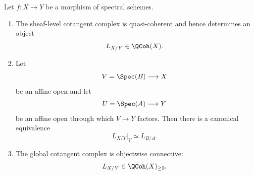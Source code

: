 \begin{theorem}
\label{thm:global-cotangent-affine-compatibility}
Let $f:X\to Y$ be a morphism of spectral schemes.
\begin{enumerate}[label=(\roman*)]
    \item The sheaf-level cotangent complex is quasi-coherent and hence
    determines an object
    \[
        L_{X/Y}
        \in
        \QCoh(X).
    \]

    \item Let
    \[
        V=\Spec(B)
        \longrightarrow
        X
    \]
    be an affine open and let
    \[
        U=\Spec(A)
        \longrightarrow
        Y
    \]
    be an affine open through which $V\to Y$ factors. Then there is a
    canonical equivalence
    \[
        L_{X/Y}|_V
        \simeq
        L_{B/A}.
    \]

    \item The global cotangent complex is objectwise connective:
    \[
        L_{X/Y}
        \in
        \QCoh(X)_{\geq0}.
    \]
\end{enumerate}
\end{theorem}
